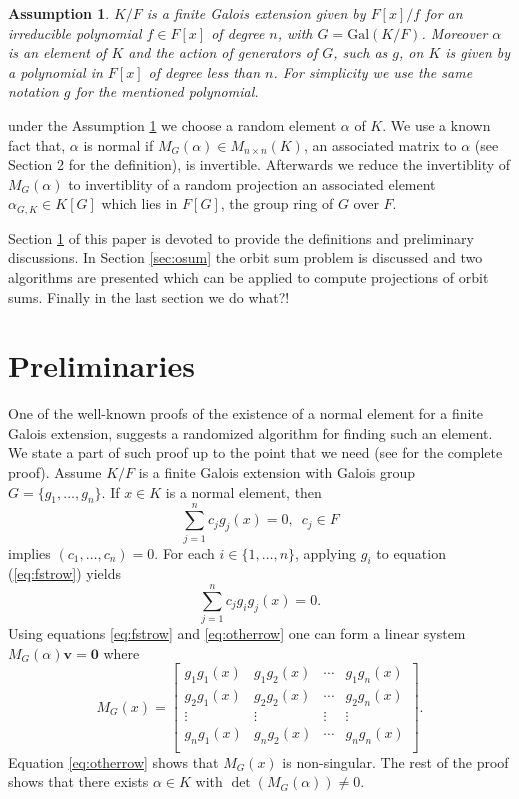 \documentclass[sigconf]{acmart}
\newcommand{\osum}[2]{\alpha_{#1,#2}}
\theoremstyle{acmplain}
\newtheorem{assumption}{Assumption}
\begin{document}
\begin{assumption}\label{assum}
$K/F$ is a finite Galois extension given by $ F[x]/f$ for an irreducible polynomial $f\in F[x]$ of degree $n$, with
 $G = \mathrm{Gal}(K/F)$. Moreover $\alpha$ is an element of $K$ and the action of generators of $ G$, such as $g$, on $K$ is given by a polynomial in $F[x]$ of degree less than $n$. For simplicity we use the same notation $g$ for the mentioned 
 polynomial.
\end{assumption}

under the Assumption \ref{assum} we choose a random element $\alpha$ of $K$. We use a known fact that, $\alpha$ is normal 
if $M_G(\alpha) \in M_{n\times n}(K)$, an associated matrix to $\alpha$ (see Section 2 for the definition), is invertible. 
Afterwards we reduce the invertiblity of $M_G(\alpha)$ to invertiblity of a random projection an associated element 
$\osum{G}{K} \in K[G]$ which lies in $F[G]$, the group ring of $G$ over $F$. 

Section \ref{sec:pre} of this paper is devoted to provide the definitions and preliminary discussions. In Section \ref{sec:osum} 
the orbit sum problem is discussed and two algorithms are presented which can be applied to compute projections of orbit sums.
Finally in the last section we do what?!


\section{Preliminaries} \label{sec:pre}
One of the well-known proofs of the existence of a normal element for a finite Galois extension, suggests a randomized 
algorithm for finding such an element. We state a part of such proof up to the point that we need (see \cite[Theorem 6.13.1]{Lang} for the complete proof). Assume $K/F$ is a finite Galois extension with Galois group $G = \lbrace g_1 , \ldots ,
 g_n \rbrace$. If $x \in K$ is a normal element, then
 \begin{equation}\label{eq:fstrow}
 \sum_{j=1}^n 
 c_j g_j(x)=0, \,\,\, c_j \in F 
 \end{equation} 
 implies $(c_1, \ldots ,c_n) = 0$. For each $i \in \lbrace 1, \ldots , n\rbrace$, applying $g_i$ to equation (\ref{eq:fstrow}) yields
\begin{equation} \label{eq:otherrow}
 \sum_{j=1}^n 
 c_j g_i g_j(x)=0.
 \end{equation}
 Using equations \ref{eq:fstrow} and \ref{eq:otherrow} one can form a linear system $M_G(\alpha)\textbf{v} = \textbf{0}$ where 
 $$ M_G(x) =
\begin{bmatrix}
g_1 g_1(x) & g_1 g_2(x) & \cdots & g_1 g_n(x) \\
g_2 g_1(x) & g_2 g_2(x) & \cdots & g_2 g_n(x) \\
\vdots		& \vdots	& \vdots & \vdots \\
g_n g_1(x) & g_n g_2(x) & \cdots & g_n g_n(x) \\
\end{bmatrix}. 
 $$
 Equation \ref{eq:otherrow} shows that $M_G(x)$ is non-singular. The rest of the proof shows that there exists $\alpha \in K$ with $\det(M_G(\alpha))\neq 0$.
 
\end{document}
